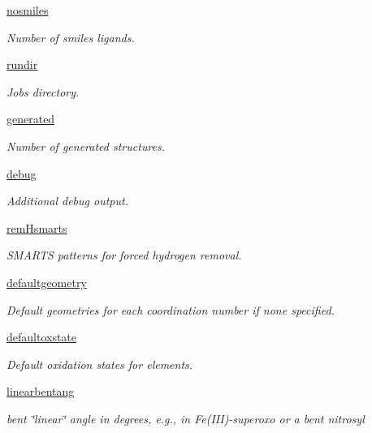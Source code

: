 \begin{DoxyCompactItemize}
\hyperlink{classmolSimplify_1_1Classes_1_1globalvars_1_1globalvars_a7278c741b4b14c75a35e78c48029bae5}{nosmiles}
\begin{DoxyCompactList}\small\item\em Number of smiles ligands. \end{DoxyCompactList}\item 
\hyperlink{classmolSimplify_1_1Classes_1_1globalvars_1_1globalvars_aff31ae57d2359a0ae0ac5610e04ee575}{rundir}
\begin{DoxyCompactList}\small\item\em Jobs directory. \end{DoxyCompactList}\item 
\hyperlink{classmolSimplify_1_1Classes_1_1globalvars_1_1globalvars_af8626582089901f25cbc2e52716ea97f}{generated}
\begin{DoxyCompactList}\small\item\em Number of generated structures. \end{DoxyCompactList}\item 
\hyperlink{classmolSimplify_1_1Classes_1_1globalvars_1_1globalvars_a682ee019a361f8f3efd917f60fde0e28}{debug}
\begin{DoxyCompactList}\small\item\em Additional debug output. \end{DoxyCompactList}\item 
\hyperlink{classmolSimplify_1_1Classes_1_1globalvars_1_1globalvars_abfe965b424ea5be872ce1f4742cb7622}{rem\+Hsmarts}
\begin{DoxyCompactList}\small\item\em S\+M\+A\+R\+TS patterns for forced hydrogen removal. \end{DoxyCompactList}\item 
\hyperlink{classmolSimplify_1_1Classes_1_1globalvars_1_1globalvars_a5fdd51f4ad43b415cac7e4924b662c7a}{defaultgeometry}
\begin{DoxyCompactList}\small\item\em Default geometries for each coordination number if none specified. \end{DoxyCompactList}\item 
\hyperlink{classmolSimplify_1_1Classes_1_1globalvars_1_1globalvars_aac4e40db29f86a9b37185771fb1cfdcb}{defaultoxstate}
\begin{DoxyCompactList}\small\item\em Default oxidation states for elements. \end{DoxyCompactList}\item 
\hyperlink{classmolSimplify_1_1Classes_1_1globalvars_1_1globalvars_aa72694783268ea07eb775aafcd0bc4f0}{linearbentang}
\begin{DoxyCompactList}\small\item\em bent \char`\"{}linear\char`\"{} angle in degrees, e.\+g., in Fe(\+I\+I\+I)-\/superoxo or a bent nitrosyl \end{DoxyCompactList}\end{DoxyCompactItemize}


